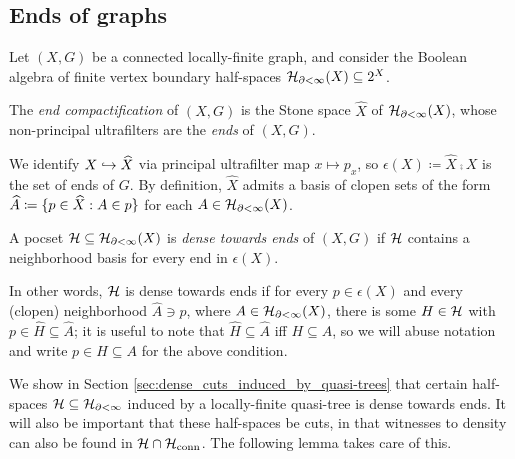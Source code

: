 \documentclass[reqno]{amsart}
\begin{document}
    \subsection{Ends of graphs}

    Let $(X,G)$ be a connected locally-finite graph, and consider the Boolean algebra of finite vertex boundary half-spaces $\mathcal{H}_{\partial<\infty}(X)\subseteq2^X$.

    \begin{definition}
        The \textit{end compactification} of $(X,G)$ is the Stone space $\widehat{X}$ of $\mathcal{H}_{\partial<\infty}(X)$, whose non-principal ultrafilters are the \textit{ends} of $(X,G)$.
    \end{definition}

    We identify $X\hookrightarrow\widehat{X}$ via principal ultrafilter map $x\mapsto p_x$, so $\epsilon(X)\coloneqq\widehat{X}\comp X$ is the set of ends of $G$. By definition, $\widehat{X}$ admits a basis of clopen sets of the form $\widehat{A}\coloneqq\{p\in\widehat{X}: A\in p\}$ for each $A\in\mathcal{H}_{\partial<\infty}(X)$.

    \begin{definition}
        A pocset $\mathcal{H}\subseteq\mathcal{H}_{\partial<\infty}(X)$ is \textit{dense towards ends} of $(X,G)$ if $\mathcal{H}$ contains a neighborhood basis for every end in $\epsilon(X)$.

        In other words, $\mathcal{H}$ is dense towards ends if for every $p\in\epsilon(X)$ and every (clopen) neighborhood $\widehat{A}\ni p$, where $A\in\mathcal{H}_{\partial<\infty}(X)$, there is some $H\in\mathcal{H}$ with $p\in\widehat{H}\subseteq\widehat{A}$; it is useful to note that $\widehat{H}\subseteq\widehat{A}$ iff $H\subseteq A$, so we will abuse notation and write $p\in H\subseteq A$ for the above condition.
    \end{definition}

    We show in Section \ref{sec:dense_cuts_induced_by_quasi-trees} that certain half-spaces $\mathcal{H}\subseteq\mathcal{H}_{\partial<\infty}$ induced by a locally-finite quasi-tree is dense towards ends. It will also be important that these half-spaces be cuts, in that witnesses to density can also be found in $\mathcal{H}\cap\mathcal{H}_\mathrm{conn}$. The following lemma takes care of this.
\end{document}
